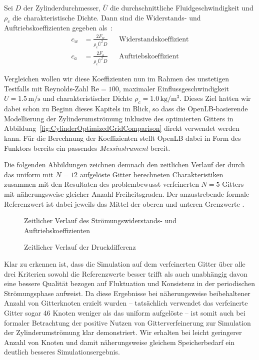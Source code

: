 \begin{Definition}
Sei \(D\) der Zylinderdurchmesser, \(\overline{U}\) die durchschnittliche Fluidgeschwindigkeit und \(\rho_c\) die charakteristische Dichte. Dann sind die Widerstands- und Auftriebskoeffizienten gegeben als~\cite[Kap.~2.2]{SchaeferTurek96}:
\begin{align*}
c_w &= \frac{2F_w}{\rho_c \overline{U}^2 D} && \text{Widerstandskoeffizient} \\
c_a &= \frac{2F_a}{\rho_c \overline{U}^2 D} && \text{Auftriebskoeffizient}
\end{align*}
\end{Definition}

Vergleichen wollen wir diese Koeffizienten nun im Rahmen des unstetigen Testfalls \cite[2.2b]{SchaeferTurek96} mit Reynolds-Zahl \(\text{Re}=100\), maximaler Einflussgeschwindigkeit \(U = 1.5 \,\text{m}/\text{s}\) und charakteristischer Dichte \(\rho_c = 1.0 \,\text{kg}/\text{m}^3\). Dieses Ziel hatten wir dabei schon zu Beginn dieses Kapitels im Blick, so dass die OpenLB-basierende Modellierung der Zylinderumströmung inklusive des optimierten Gitters in Abbildung~\ref{fig:CylinderOptimizedGridComparison} direkt verwendet werden kann. Für die Berechnung der Koeffizienten stellt OpenLB dabei in Form des  Funktors bereits ein passendes \emph{Messinstrument} bereit.

\newpage
Die folgenden Abbildungen zeichnen demnach den zeitlichen Verlauf der durch das uniform mit \(N=12\) aufgelöste Gitter berechneten Charakteristiken zusammen mit den Resultaten des problembewusst verfeinerten \(N=5\) Gitters mit näherungsweise gleicher Anzahl Freiheitsgraden. Der anzustrebende formale Referenzwert ist dabei jeweils das Mittel der oberen und unteren Grenzwerte \cite[Tabelle~4]{SchaeferTurek96}.

\bigskip

\begin{figure}[H]
\centering

\caption{Zeitlicher Verlauf des Strömungswiderstands- und Auftriebskoeffizienten}
\end{figure}

\begin{figure}[H]
\centering

\caption{Zeitlicher Verlauf der Druckdifferenz}
\end{figure}

Klar zu erkennen ist, dass die Simulation auf dem verfeinerten Gitter über alle drei Kriterien sowohl die Referenzwerte besser trifft als auch unabhängig davon eine bessere Qualität bezogen auf Fluktuation und Konsistenz in der periodischen Strömungsphase aufweist. Da diese Ergebnisse bei näherungsweise beibehaltener Anzahl von Gitterknoten erzielt wurden -- tatsächlich verwendet das verfeinerte Gitter sogar 46 Knoten weniger als das uniform aufgelöste -- ist somit auch bei formaler Betrachtung der positive Nutzen von Gitterverfeinerung zur Simulation der Zylinderumströmung klar demonstriert. Wir erhalten bei leicht geringerer Anzahl von Knoten und damit näherungsweise gleichem Speicherbedarf ein deutlich besseres Simulationsergebnis.

